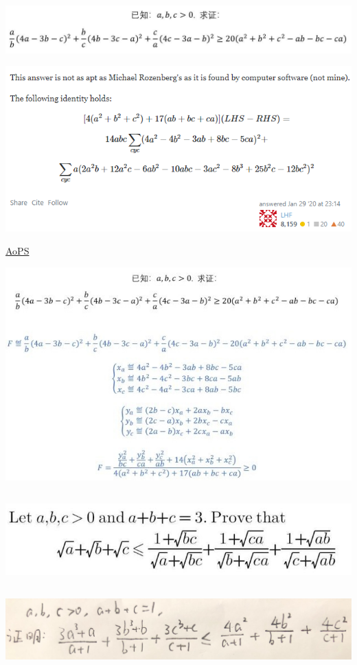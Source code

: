 \documentclass[UTF8]{ctexart}
\begin{document}
\subsection{}
\begin{center}
	\includegraphics[width=0.8\linewidth]{a36}
\end{center}
\begin{center}
	\includegraphics[width=0.8\linewidth]{a37}
\end{center}
\href{https://math.stackexchange.com/questions/3527494/}{AoPS}
\begin{center}
	\includegraphics[width=0.7\linewidth]{a38}
\end{center}
\subsection{}
\begin{center}
	\includegraphics[width=0.5\linewidth]{a18}
\end{center}
\subsection{}
\begin{center}
	\includegraphics[width=0.8\linewidth]{a20}
\end{center}
\end{document}
